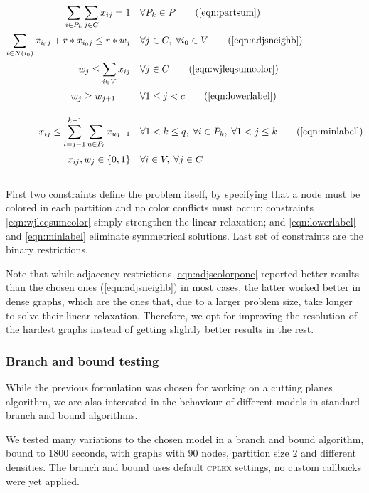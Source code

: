 \begin{align}
\sum_{i \in P_k} \sum_{j \in C} x_{ij} = 1 \quad &\forall P_k \in P \tag{\ref{eqn:partsum}} \\
 \sum_{i \in N(i_0)} x_{i_0j} + r * x_{i_0j} \leq r * w_j \quad &\forall j \in C, \; \forall i_0 \in V \tag{\ref{eqn:adjsneighb}} \\
 w_j \leq \sum_{i \in V} x_{ij} \quad &\forall j \in C \tag{\ref{eqn:wjleqsumcolor}} \\
 w_j \geq w_{j+1} \sumheight \quad &\forall 1 \leq j < c \tag{\ref{eqn:lowerlabel}} \\
 x_{ij} \leq \sum_{l = j-1}^{k-1} \sum_{u \in P_l} x_{uj-1} \quad &\forall 1 < k \leq q, \; \forall i \in P_k, \; \forall 1 < j \leq k \tag{\ref{eqn:minlabel}} \\
 x_{ij}, w_{j} \in \{0,1\} \quad &\forall i \in V, \; \forall j \in C \sumheight \nonumber
\end{align}

First two constraints define the problem itself, by specifying that a node must be colored in each partition and no color conflicts must occur; constraints \ref{eqn:wjleqsumcolor} simply strengthen the linear relaxation; and \ref{eqn:lowerlabel} and \ref{eqn:minlabel} eliminate symmetrical solutions. Last set of constraints are the binary restrictions.

Note that while adjacency restrictions \ref{eqn:adjscolorpone} reported better results than the chosen ones (\ref{eqn:adjsneighb}) in most cases, the latter worked better in dense graphs, which are the ones that, due to a larger problem size, take longer to solve their linear relaxation. Therefore, we opt for improving the resolution of the hardest graphs instead of getting slightly better results in the rest. 

\subsubsection*{Branch and bound testing}

While the previous formulation was chosen for working on a cutting planes algorithm, we are also interested in the behaviour of different models in standard branch and bound algorithms. 

We tested many variations to the chosen model in a branch and bound algorithm, bound to $1800$ seconds, with graphs with $90$ nodes, partition size $2$ and different densities. The branch and bound uses default \textsc{cplex} settings, no custom callbacks were yet applied.

